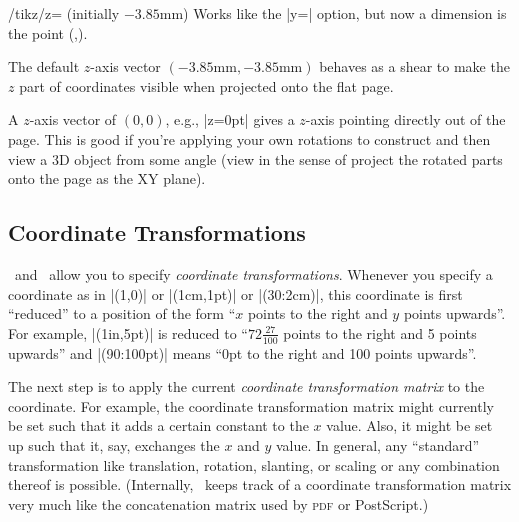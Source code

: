 \begin{key}{/tikz/z= (initially \normalfont$-3.85$mm)}
    Works like the |y=| option, but now a dimension is the point
    (,).

    The default $z$-axis vector $(-3.85\text{mm},-3.85\text{mm})$ behaves as a
    shear to make the $z$ part of coordinates visible when projected onto the
    flat page.

    A $z$-axis vector of $(0,0)$, e.g., |z=0pt| gives a $z$-axis pointing
    directly out of the page.  This is good if you're applying your own
    rotations to construct and then view a 3D object from some angle (view in
    the sense of project the rotated parts onto the page as the XY plane).
\begin{codeexample}[]
\end{codeexample}
\end{key}


\subsection{Coordinate Transformations}

\pgfname\ and \tikzname\ allow you to specify \emph{coordinate
transformations}. Whenever you specify a coordinate as in |(1,0)| or
|(1cm,1pt)| or |(30:2cm)|, this coordinate is first ``reduced'' to a position
of the form ``$x$ points to the right and $y$ points upwards''. For example,
|(1in,5pt)| is reduced to ``$72\frac{27}{100}$ points to the right and 5 points
upwards'' and |(90:100pt)| means ``0pt to the right and 100 points upwards''.

The next step is to apply the current \emph{coordinate transformation matrix}
to the coordinate. For example, the coordinate transformation matrix might
currently be set such that it adds a certain constant to the $x$ value. Also,
it might be set up such that it, say, exchanges the $x$ and $y$ value. In
general, any ``standard'' transformation like translation, rotation, slanting,
or scaling or any combination thereof is possible. (Internally, \pgfname\ keeps
track of a coordinate transformation matrix very much like the concatenation
matrix used by \textsc{pdf} or PostScript.)
%
\begin{codeexample}[]
\end{codeexample}

